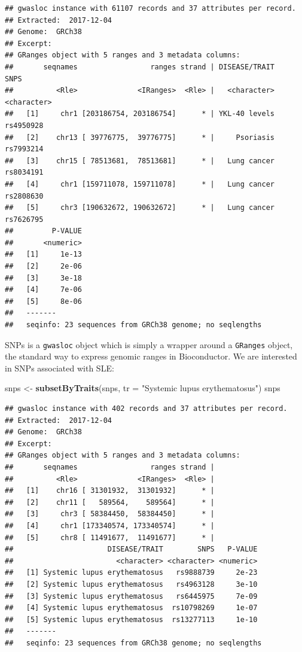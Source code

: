 \documentclass[9pt,a4paper,]{extarticle}
\newenvironment{Shaded}{\begin{snugshade}}{\end{snugshade}}
\newcommand{\KeywordTok}[1]{\textcolor[rgb]{0.13,0.29,0.53}{\textbf{#1}}}
\newcommand{\DataTypeTok}[1]{\textcolor[rgb]{0.13,0.29,0.53}{#1}}
\newcommand{\StringTok}[1]{\textcolor[rgb]{0.31,0.60,0.02}{#1}}
\newcommand{\NormalTok}[1]{#1}
\begin{document}
\begin{verbatim}
## gwasloc instance with 61107 records and 37 attributes per record.
## Extracted:  2017-12-04 
## Genome:  GRCh38 
## Excerpt:
## GRanges object with 5 ranges and 3 metadata columns:
##       seqnames                 ranges strand | DISEASE/TRAIT        SNPS
##          <Rle>              <IRanges>  <Rle> |   <character> <character>
##   [1]     chr1 [203186754, 203186754]      * | YKL-40 levels   rs4950928
##   [2]    chr13 [ 39776775,  39776775]      * |     Psoriasis   rs7993214
##   [3]    chr15 [ 78513681,  78513681]      * |   Lung cancer   rs8034191
##   [4]     chr1 [159711078, 159711078]      * |   Lung cancer   rs2808630
##   [5]     chr3 [190632672, 190632672]      * |   Lung cancer   rs7626795
##         P-VALUE
##       <numeric>
##   [1]     1e-13
##   [2]     2e-06
##   [3]     3e-18
##   [4]     7e-06
##   [5]     8e-06
##   -------
##   seqinfo: 23 sequences from GRCh38 genome; no seqlengths
\end{verbatim}

SNPs is a \texttt{gwasloc} object which is simply a wrapper around a \texttt{GRanges} object, the standard way to express genomic ranges in Bioconductor.
We are interested in SNPs associated with SLE:

\begin{Shaded}
\begin{Highlighting}[]
\NormalTok{snps <-}\StringTok{ }\KeywordTok{subsetByTraits}\NormalTok{(snps, }\DataTypeTok{tr =} \StringTok{"Systemic lupus erythematosus"}\NormalTok{)}
\NormalTok{snps}
\end{Highlighting}
\end{Shaded}

\begin{verbatim}
## gwasloc instance with 402 records and 37 attributes per record.
## Extracted:  2017-12-04 
## Genome:  GRCh38 
## Excerpt:
## GRanges object with 5 ranges and 3 metadata columns:
##       seqnames                 ranges strand |
##          <Rle>              <IRanges>  <Rle> |
##   [1]    chr16 [ 31301932,  31301932]      * |
##   [2]    chr11 [   589564,    589564]      * |
##   [3]     chr3 [ 58384450,  58384450]      * |
##   [4]     chr1 [173340574, 173340574]      * |
##   [5]     chr8 [ 11491677,  11491677]      * |
##                      DISEASE/TRAIT        SNPS   P-VALUE
##                        <character> <character> <numeric>
##   [1] Systemic lupus erythematosus   rs9888739     2e-23
##   [2] Systemic lupus erythematosus   rs4963128     3e-10
##   [3] Systemic lupus erythematosus   rs6445975     7e-09
##   [4] Systemic lupus erythematosus  rs10798269     1e-07
##   [5] Systemic lupus erythematosus  rs13277113     1e-10
##   -------
##   seqinfo: 23 sequences from GRCh38 genome; no seqlengths
\end{verbatim}
\end{document}
